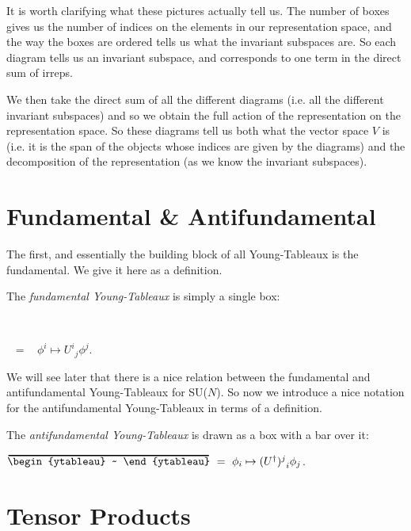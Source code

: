 It is worth clarifying what these pictures actually tell us. The number of boxes gives us the number of indices on the elements in our representation space, and the way the boxes are ordered tells us what the invariant subspaces are. So each diagram tells us an invariant subspace, and corresponds to one term in the direct sum of irreps. 

We then take the direct sum of all the different diagrams (i.e. all the different invariant subspaces) and so we obtain the full action of the representation on the representation space. So these diagrams tell us both what the vector space $V$ is (i.e. it is the span of the objects whose indices are given by the diagrams) and the decomposition of the representation (as we know the invariant subspaces).

\section{Fundamental \& Antifundamental}

The first, and essentially the building block of all Young-Tableaux is the fundamental. We give it here as a definition.

    The \textit{fundamental Young-Tableaux} is simply a single box:
    \begin{center}
        \begin{ytableau}
            ~ 
        \end{ytableau} ~ = ~ $\phi^i \mapsto {U^i}_j \phi^j$.
    \end{center}
\ed

We will see later that there is a nice relation between the fundamental and antifundamental Young-Tableaux for SU($N$). So now we introduce a nice notation for the antifundamental Young-Tableaux in terms of a definition.

    The \textit{antifundamental Young-Tableaux} is drawn as a box with a bar over it:
    \begin{center}
        $\myov{\begin{ytableau}
            ~ 
        \end{ytableau}} ~ = ~ \phi_i \mapsto {(U^{\dagger})^j}_i \phi_j$.
    \end{center}
\ed

\section{Tensor Products}

